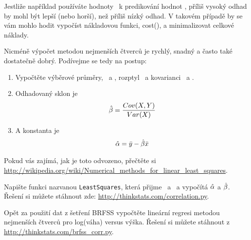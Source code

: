 \documentclass[12pt]{book}
\begin{document}
Jestliže například používáte hodnoty \X~k predikování hodnot \Y,
příliš vysoký odhad by mohl být lepší (nebo horší), než příliš nízký odhad. V takovém případě by se vám mohlo hodit vypočíst nákladovou funkci, cost(\myeps{}), a minimalizovat celkové náklady.

Nicméně výpočet metodou nejmenších čtverců je rychlý, snadný a často také dostatečně dobrý. Podívejme se tedy na postup:

\begin{enumerate}

\item Vypočtěte výběrové průměry, \myxbar~a \myybar, rozptyl \X~a kovarianci \X~a \Y.

\item Odhadovaný sklon je
%
\[ \hat{\beta} = \frac{Cov(X,Y)}{Var(X)} \]
%
\item A konstanta je
%
\[ \hat{\alpha} = \bar{y} - \hat{\beta} \bar{x} \]
%
\end{enumerate}

Pokud vás zajímá, jak je toto odvozeno, přečtěte si \url{http://wikipedia.org/wiki/Numerical_methods_for_linear_least_squares}.


\begin{exercise}
Napište funkci nazvanou {\tt LeastSquares}, která přijme \X~a \Y~a vypočítá
 $\hat{\alpha}$ a $\hat{\beta}$.  Řešení si můžete stáhnout zde:
\url{http://thinkstats.com/correlation.py}.  

\end{exercise}

\begin{exercise}
Opět za použití dat z šetření BRFSS vypočtěte lineární regresi metodou nejmenších čtverců pro log(váha) versus výška. Řešení si můžete stáhnout z \url{http://thinkstats.com/brfss_corr.py}.

\end{exercise}
\end{document}
